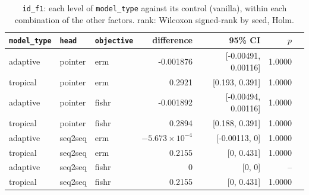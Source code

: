 \documentclass[10pt]{article}
\begin{document}
{\small
\begin{longtable}{lllrrrl}
\caption{\texttt{id\_f1}: each level of \texttt{model\_type} against its control (vanilla), within each combination of the other factors. rank: Wilcoxon signed-rank by seed, Holm.}\label{tab:control-id_f1}\\
\toprule
\texttt{model\_type} & \texttt{head} & \texttt{objective} & difference & 95\% CI & $p$ & \\
\midrule
\endhead
adaptive & pointer & erm & -0.001876 & [-0.00491, 0.00116] & 1.0000 & \\
tropical & pointer & erm & 0.2921 & [0.193, 0.391] & 1.0000 & \\
adaptive & pointer & fishr & -0.001892 & [-0.00494, 0.00116] & 1.0000 & \\
tropical & pointer & fishr & 0.2894 & [0.188, 0.391] & 1.0000 & \\
adaptive & seq2seq & erm & $-5.673\times10^{-4}$ & [-0.00113, 0] & 1.0000 & \\
tropical & seq2seq & erm & 0.2155 & [0, 0.431] & 1.0000 & \\
adaptive & seq2seq & fishr & 0 & [0, 0] & -- & \\
tropical & seq2seq & fishr & 0.2155 & [0, 0.431] & 1.0000 & \\
\bottomrule
\end{longtable}
}
\end{document}
